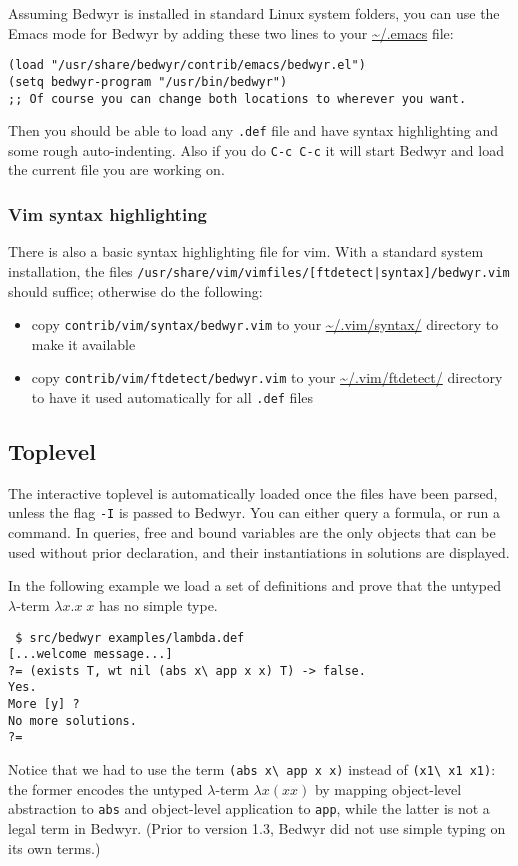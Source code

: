 \documentclass{article}
\begin{document}
Assuming Bedwyr is installed in standard Linux system folders, you can
use the Emacs mode for Bedwyr by adding these two lines to your
\url{~/.emacs} file:
\begin{verbatim}
(load "/usr/share/bedwyr/contrib/emacs/bedwyr.el")
(setq bedwyr-program "/usr/bin/bedwyr")
;; Of course you can change both locations to wherever you want.
\end{verbatim}

Then you should be able to load any \verb:.def: file
and have syntax highlighting and some rough auto-indenting.
Also if you do \verb.C-c C-c. it will start Bedwyr
and load the current file you are working on.

\subsubsection{Vim syntax highlighting}

There is also a basic syntax highlighting file for vim. With a standard
system installation, the files
\verb+/usr/share/vim/vimfiles/[ftdetect|syntax]/bedwyr.vim+ should
suffice; otherwise do the following:
\begin{itemize}
  \item copy {\tt contrib/vim/syntax/bedwyr.vim} to
    your \url{~/.vim/syntax/} directory to make it available
  \item copy {\tt contrib/vim/ftdetect/bedwyr.vim} to
    your \url{~/.vim/ftdetect/} directory to have it used automatically
    for all {\tt *.def} files
\end{itemize}

\subsection{Toplevel}

The interactive toplevel is automatically loaded once the files have
been parsed, unless the flag \verb.-I. is passed to Bedwyr. You can
either query a formula, or run a command. In queries, free and bound
variables are
the only objects that can be used without prior declaration, and their
instantiations in solutions are displayed.

In the following example we load a set of definitions and prove that
the untyped $\lambda$-term $\lambda x.x\;x$ has no simple type.

\begin{verbatim}
 $ src/bedwyr examples/lambda.def
[...welcome message...]
?= (exists T, wt nil (abs x\ app x x) T) -> false.
Yes.
More [y] ?
No more solutions.
?=
\end{verbatim}
Notice that we had to use the term \verb+(abs x\ app x x)+ instead of
\verb+(x1\ x1 x1)+: the former encodes the untyped $\lambda$-term
$\lambda x (x x)$ by mapping
object-level abstraction to {\tt abs} and object-level application to
{\tt app}, while the latter is not a legal term in Bedwyr.  (Prior to
version 1.3, Bedwyr did not use simple typing on its own terms.)
\end{document}

